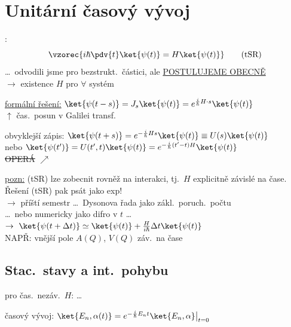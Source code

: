 \section{Unitární časový vývoj}

:
\[
  \vzorec{i\hbar\pdv{t}\ket{\psi(t)} = H\ket{\psi(t)}} \qquad (\text{tSR})
\]
\dots\ odvodili jsme pro bezstrukt.\ částici, ale \underline{POSTULUJEME OBECNĚ} \\
\hspace*{6cm} $\to$ existence $H$ pro $\forall$ systém

\underline{formální řešení:} \quad
$\ket{\psi(t-s)} = J_s\ket{\psi(t)} = e^{\frac{i}{\hbar}H\cdot s}\ket{\psi(t)}$ \\
\hspace*{6.2cm} $\uparrow$ čas.\ posun v Galilei transf.

obvyklejší zápis: \quad $\ket{\psi(t+s)} = e^{-\frac{i}{\hbar}Hs}\ket{\psi(t)} \equiv U(s)\ket{\psi(t)}$ \\
\phantom{obvyklejší zápis:} \quad nebo \quad
$\ket{\psi(t')} = U(t',t)\ket{\psi(t)} = e^{-\frac{i}{\hbar}(t'-t)H}\ket{\psi(t)}$ \\
\hspace*{3cm} \sout{OPERÁ}  $\nearrow$

\underline{pozn:} (tSR) lze zobecnit rovněž na interakci, tj.\ $H$ explicitně závislé na čase. Řešení (tSR) pak  psát jako exp! \\
\quad $\to$ příští semestr \dots\ Dysonova řada jako zákl.\ poruch.\ počtu \\
\quad\quad \dots\ nebo numericky jako difro v $t$ \dots \quad
$\to\ \ket{\psi(t+\Delta t)} \simeq \ket{\psi(t)} + \frac{H}{i\hbar}\Delta t\ket{\psi(t)}$ \\
\quad NAPŘ: vnější pole $A(Q)$, $V(Q)$ záv.\ na čase

\subsection{Stac.\ stavy a int.\ pohybu}
pro čas.\ nezáv.\ $H$: \quad \dots\  \quad
{}

časový vývoj: \quad $\ket{E_n,\alpha(t)} = e^{-\frac{i}{\hbar}E_nt}\ket{E_n,\alpha}\big|_{t=0}$

